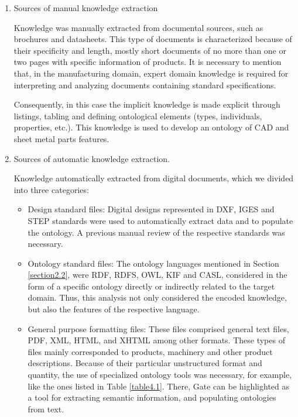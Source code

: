 \begin{enumerate}
	\item Sources of manual knowledge extraction
	
	Knowledge was manually extracted from documental sources, such as brochures and datasheets. This type of documents is characterized because of their specificity  and length, mostly short documents of no more than one or two pages with specific information of products. It is necessary to mention that, in the manufacturing domain, expert domain knowledge is required for interpreting and analyzing  documents containing standard specifications.   
	
	Consequently, in this case the implicit knowledge is made explicit through listings, tabling and defining ontological elements (types, individuals, properties, etc.). This knowledge is used to develop an ontology of CAD and sheet metal parts features. 
	
	\item Sources of  automatic knowledge extraction.
	
	Knowledge automatically extracted from digital documents, which we divided into three categories:
	
	\begin{itemize}
		\item Design standard files: Digital designs represented in DXF, IGES and STEP standards were used to automatically extract data and to populate the ontology. A previous manual review of the respective standards was necessary. 
		
		\item Ontology standard files: The ontology   languages mentioned in Section \ref{section2.2}, were RDF, RDFS, OWL, KIF and CASL, considered in the form of a specific ontology directly or indirectly related to the target domain. Thus, this analysis not only considered the encoded knowledge, but also the features of the respective language.
		
		\item General purpose formatting files: These files comprised general  text    files, PDF, XML, HTML, and XHTML among other formats. These types of files mainly corresponded to products, machinery and other product descriptions. Because of their particular unstructured format and quantity, the use of specialized ontology tools was necessary, for example, like the ones listed in Table \ref{table4.1}. There, Gate can be highlighted as a tool for extracting semantic information, and populating ontologies from text.   
		
	\end{itemize}
	
\end{enumerate}


